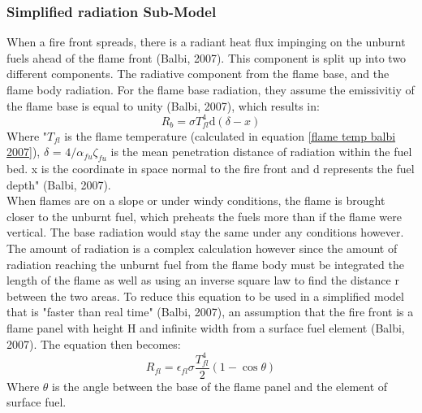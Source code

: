 \documentclass{article}
\begin{document}
\subsubsection{Simplified radiation Sub-Model}
\indent When a fire front spreads, there is a radiant heat flux impinging on the unburnt fuels ahead of the flame front (Balbi, 2007). This component is split up into two different components. The radiative component from the flame base, and the flame body radiation. For the flame base radiation, they assume the emissivitiy of the flame base is equal to unity (Balbi, 2007), which results in:
\begin{equation}
	\label{R_b 2007}
	R_b = \sigma T^{4}_{fl} \mathrm{d}(\delta - x)
\end{equation}
Where "$T_{fl}$ is the flame temperature (calculated in equation \ref{flame temp balbi 2007}), $\delta$ = $4/ \alpha _{fu} \zeta _ {fu}$ is the mean penetration distance of radiation within the fuel bed. x is the coordinate in space normal to the fire front and d represents the fuel depth" (Balbi, 2007). \\
\indent When flames are on a slope or under windy conditions, the flame is brought closer to the unburnt fuel, which preheats the fuels more than if the flame were vertical. The base radiation would stay the same under any conditions however. The amount of radiation is a complex calculation however since the amount of radiation reaching the unburnt fuel from the flame body must be integrated the length of the flame as well as using an inverse square law to find the distance r between the two areas. To reduce this equation to be used in a simplified model that is "faster than real time" (Balbi, 2007), an assumption that the fire front is a flame panel with height H and infinite width from a surface fuel element (Balbi, 2007). The equation then becomes:
\begin{equation}
	\label{flame_base_2007}
	R_{fl} = \epsilon_{fl} \sigma \frac {T^{4}_{fl}} {2} (1 - \cos \theta)
\end{equation}
Where $\theta $ is the angle between the base of the flame panel and the element of surface fuel. 
\end{document}
